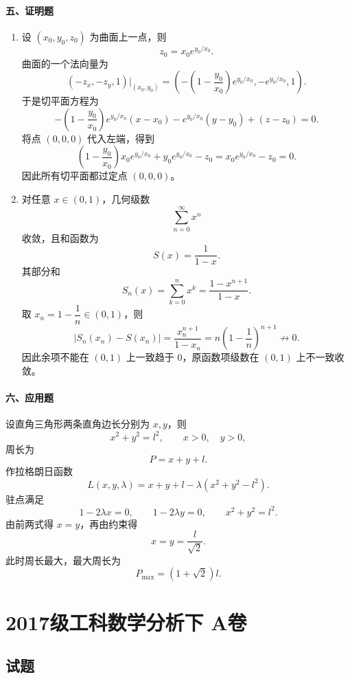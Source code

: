 \paragraph*{五、证明题}
\begin{enumerate}
  \item 设 $(x_0,y_0,z_0)$ 为曲面上一点，则
  \[
    z_0=x_0e^{y_0/x_0}.
  \]
  曲面的一个法向量为
  \[
    \left(-z_x,-z_y,1\right)\bigg|_{(x_0,y_0)}
    =
    \left(
      -\left(1-\frac{y_0}{x_0}\right)e^{y_0/x_0},
      -e^{y_0/x_0},
      1
    \right).
  \]
  于是切平面方程为
  \[
    -\left(1-\frac{y_0}{x_0}\right)e^{y_0/x_0}(x-x_0)
    -e^{y_0/x_0}(y-y_0)
    +(z-z_0)=0.
  \]
  将点 $(0,0,0)$ 代入左端，得到
  \[
    \left(1-\frac{y_0}{x_0}\right)x_0e^{y_0/x_0}
    +y_0e^{y_0/x_0}-z_0
    =
    x_0e^{y_0/x_0}-z_0=0.
  \]
  因此所有切平面都过定点 $(0,0,0)$。

  \item 对任意 $x\in(0,1)$，几何级数
  \[
    \sum_{n=0}^{\infty}x^n
  \]
  收敛，且和函数为
  \[
    S(x)=\frac1{1-x}.
  \]
  其部分和
  \[
    S_n(x)=\sum_{k=0}^{n}x^k=\frac{1-x^{n+1}}{1-x}.
  \]
  取 $x_n=1-\dfrac1n\in(0,1)$，则
  \[
    |S_n(x_n)-S(x_n)|
    =
    \frac{x_n^{n+1}}{1-x_n}
    =
    n\left(1-\frac1n\right)^{n+1}\not\to0.
  \]
  因此余项不能在 $(0,1)$ 上一致趋于 $0$，原函数项级数在 $(0,1)$ 上不一致收敛。
\end{enumerate}

\paragraph*{六、应用题}
设直角三角形两条直角边长分别为 $x,y$，则
\[
  x^2+y^2=l^2,\qquad x>0,\quad y>0,
\]
周长为
\[
  P=x+y+l.
\]
作拉格朗日函数
\[
  L(x,y,\lambda)=x+y+l-\lambda(x^2+y^2-l^2).
\]
驻点满足
\[
  1-2\lambda x=0,\qquad 1-2\lambda y=0,\qquad x^2+y^2=l^2.
\]
由前两式得 $x=y$，再由约束得
\[
  x=y=\frac{l}{\sqrt2}.
\]
此时周长最大，最大周长为
\[
  P_{\max}=(1+\sqrt2)l.
\]

\section{2017级工科数学分析下 A卷}

\subsection{试题}

